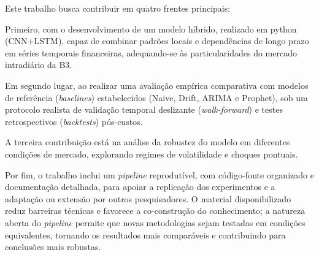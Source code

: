 Este trabalho busca contribuir em quatro frentes principais: 

Primeiro, com o desenvolvimento de um modelo híbrido, realizado em python (CNN+LSTM), capaz de combinar padrões locais e dependências de longo prazo em séries temporais financeiras, adequando-se às particularidades do mercado intradiário da B3. 

Em segundo lugar, ao realizar uma avaliação empírica comparativa com modelos de referência (\textit{baselines}) estabelecidos (Naive, Drift, ARIMA e Prophet), sob um protocolo realista de validação temporal deslizante (\textit{walk-forward}) e testes retrospectivos (\textit{backtests}) pós-custos. 

A terceira contribuição está na análise da robustez do modelo em diferentes condições de mercado, explorando regimes de volatilidade e choques pontuais. 

Por fim, o trabalho inclui um \textit{pipeline} reprodutível, com código-fonte organizado e documentação detalhada, para apoiar a replicação dos experimentos e a adaptação ou extensão por outros pesquisadores. O material disponibilizado reduz barreiras técnicas e favorece a co-construção do conhecimento; a natureza aberta do \textit{pipeline} permite que novas metodologias sejam testadas em condições equivalentes, tornando os resultados mais comparáveis e contribuindo para conclusões mais robustas.
